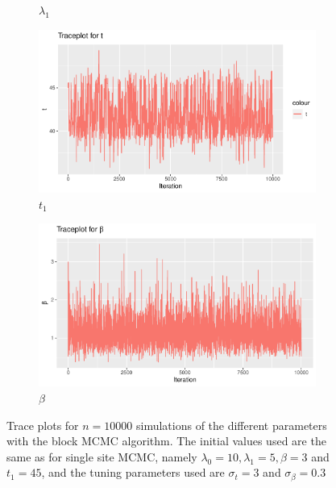 \begin{figure}[h]
\begin{subfigure}[b]{0.49\textwidth}
        \caption{$\lambda_1$}
        \label{fig:block_burnin_lam1}
    \end{subfigure}
    \begin{subfigure}[b]{0.49\textwidth}
        \centering
        \includegraphics[width = \textwidth]{Images/block_sim_t.pdf}
        \caption{$t_1$}
        \label{fig:block_burnin_t}
    \end{subfigure}
    \begin{subfigure}[b]{0.49\textwidth}
        \centering
        \includegraphics[width = \textwidth]{Images/block_sim_beta.pdf}
        \caption{$\beta$}
        \label{fig:block_burnin_beta}
    \end{subfigure}
    \caption{Trace plots for $n = 10000$ simulations of the different parameters with the block MCMC algorithm. The initial values used are the same as for single site MCMC, namely $\lambda_0 = 10, \lambda_1 = 5, \beta = 3$ and $t_1 = 45$, and the tuning parameters used are $\sigma_t = 3$ and $\sigma_{\beta} = 0.3$}
    \label{fig:burnin_blockMH}
\end{figure}

